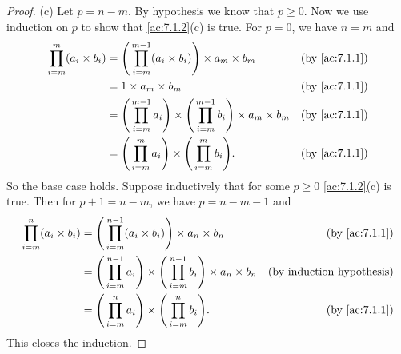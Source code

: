 \begin{proof}{(c)}
  Let \(p = n - m\).
  By hypothesis we know that \(p \geq 0\).
  Now we use induction on \(p\) to show that \cref{ac:7.1.2}(c) is true.
  For \(p = 0\), we have \(n = m\) and
  \begin{align*}
    \prod_{i = m}^m (a_i \times b_i) & = \Bigg(\prod_{i = m}^{m - 1} (a_i \times b_i)\Bigg) \times a_m \times b_m                                 & \text{(by \cref{ac:7.1.1})} \\
                                     & = 1 \times a_m \times b_m                                                                                  & \text{(by \cref{ac:7.1.1})} \\
                                     & = \Bigg(\prod_{i = m}^{m - 1} a_i\Bigg) \times \Bigg(\prod_{i = m}^{m - 1} b_i\Bigg) \times a_m \times b_m & \text{(by \cref{ac:7.1.1})} \\
                                     & = \Bigg(\prod_{i = m}^m a_i\Bigg) \times \Bigg(\prod_{i = m}^m b_i\Bigg).                                  & \text{(by \cref{ac:7.1.1})}
  \end{align*}
  So the base case holds.
  Suppose inductively that for some \(p \geq 0\) \cref{ac:7.1.2}(c) is true.
  Then for \(p + 1 = n - m\), we have \(p = n - m - 1\) and
  \begin{align*}
    \prod_{i = m}^n (a_i \times b_i) & = \Bigg(\prod_{i = m}^{n - 1} (a_i \times b_i)\Bigg) \times a_n \times b_n                                 & \text{(by \cref{ac:7.1.1})}      \\
                                     & = \Bigg(\prod_{i = m}^{n - 1} a_i\Bigg) \times \Bigg(\prod_{i = m}^{n - 1} b_i\Bigg) \times a_n \times b_n & \text{(by induction hypothesis)} \\
                                     & = \Bigg(\prod_{i = m}^n a_i\Bigg) \times \Bigg(\prod_{i = m}^n b_i\Bigg).                                  & \text{(by \cref{ac:7.1.1})}
  \end{align*}
  This closes the induction.
\end{proof}

